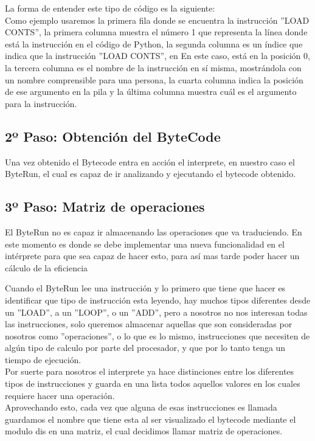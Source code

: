 La forma de entender este tipo de código es la siguiente:\\

Como ejemplo usaremos la primera fila donde se encuentra la instrucción ''LOAD CONTS'', la primera columna muestra el número 1 que representa la línea donde está la instrucción en el código de Python, la segunda columna es un índice que indica que la instrucción ''LOAD CONTS'', en En este caso, está en la posición 0, la tercera columna es el nombre de la instrucción en sí misma, mostrándola con un nombre comprensible para una persona, la cuarta columna indica la posición de ese argumento en la pila y la última columna muestra cuál es el argumento para la instrucción.\\

\subsection{2º Paso: Obtención del ByteCode}
Una vez obtenido el Bytecode entra en acción el interprete, en nuestro caso el ByteRun, el cual es capaz de ir analizando y ejecutando el bytecode obtenido.

\subsection{3º Paso: Matriz de operaciones}
El ByteRun no es capaz ir almacenando las operaciones que va traduciendo. En este momento es donde se debe implementar una nueva funcionalidad en el intérprete para que sea capaz de hacer esto, para así mas tarde poder hacer un cálculo de la eficiencia 

Cuando el ByteRun lee una instrucción y lo primero que tiene que hacer es identificar que tipo de instrucción esta leyendo, hay muchos tipos diferentes desde un ''LOAD'', a un ''LOOP'', o un ''ADD'', pero a nosotros no nos interesan todas las instrucciones, solo queremos almacenar aquellas que son consideradas por nosotros como ''operaciones'', o lo que es lo mismo, instrucciones que necesiten de algún tipo de calculo por parte del procesador, y que por lo tanto tenga un tiempo de ejecución.\\

Por suerte para nosotros el interprete ya hace distinciones entre los diferentes tipos de instrucciones y guarda en una lista todos aquellos valores en los cuales requiere hacer una operación.\\

Aprovechando esto, cada vez que alguna de esas instrucciones es llamada guardamos el nombre que tiene esta al ser visualizado el bytecode mediante el modulo dis\cite{dis} en una matriz, el cual decidimos llamar matriz de operaciones.\\

